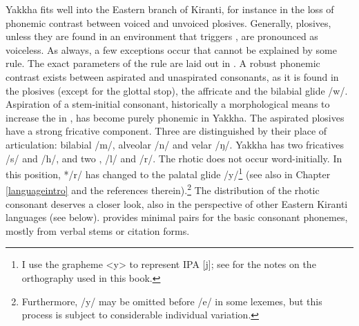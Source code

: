 \largerpage
Yakkha fits well into the Eastern branch of Kiranti, for instance in the loss of phonemic  contrast between voiced and unvoiced plosives. Generally, plosives, unless they are found in an environment that triggers , are pronounced as voiceless. As always, a few exceptions occur that cannot be explained by some rule. The exact parameters of the  rule are laid out in  . A robust phonemic contrast exists between aspirated and unaspirated consonants, as it is found in the plosives (except for the glottal stop), the affricate and the bilabial glide /w/. Aspiration of a stem-initial consonant, historically a morphological means to increase the  in  \citep{Michailovsky1994Manner, Jacques2012_Internal, Hill2014_Note}, has become purely phonemic in Yakkha.  The aspirated plosives have a strong fricative component. Three  are distinguished by their place of articulation: bilabial  /m/, alveolar /n/ and velar /ŋ/. Yakkha has two fricatives /s/ and /h/, and two , /l/ and /r/. The rhotic does not occur word-initially. In this position, */r/ has changed to the palatal glide /y/\footnote{I use the grapheme <y> to represent IPA [j]; see  for the notes on the orthography used in this book.} (see also   in Chapter \ref{languageintro} and the references therein).\footnote{Furthermore, /y/ may be omitted before /e/ in some lexemes, but this process is subject to considerable individual variation.}  The distribution of the rhotic consonant deserves a closer look, also in the perspective of other Eastern Kiranti languages (see  below).  provides minimal pairs for the basic consonant phonemes, mostly from verbal stems or citation forms.


